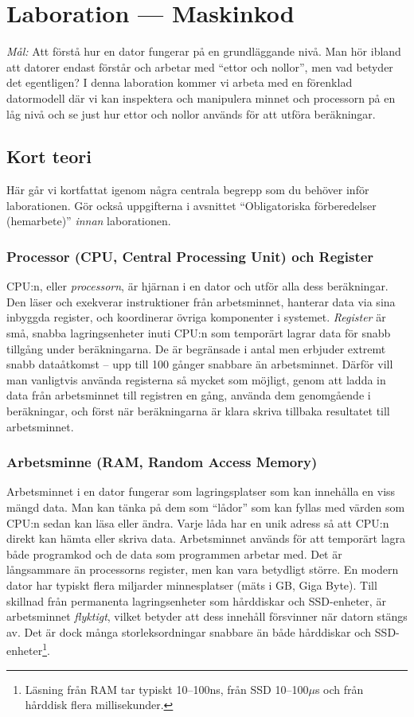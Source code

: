 
\section{Laboration  --- Maskinkod}

\emph{Mål:} Att förstå hur en dator fungerar på en grundläggande nivå. Man hör ibland att datorer endast förstår och arbetar med ``ettor och nollor'', men vad betyder det egentligen? I denna laboration kommer vi arbeta med en förenklad datormodell där vi kan inspektera och manipulera minnet och processorn på en låg nivå och se just hur ettor och nollor används för att utföra beräkningar.

\subsection{Kort teori}
Här går vi kortfattat igenom några centrala begrepp som du behöver inför laborationen. Gör också uppgifterna i avsnittet ``Obligatoriska förberedelser (hemarbete)'' \emph{innan} laborationen.

\subsubsection{Processor (CPU, Central Processing Unit) och Register}
CPU:n, eller \emph{processorn}, är hjärnan i en dator och utför alla dess beräkningar. Den läser och exekverar instruktioner från arbetsminnet, hanterar data via sina inbyggda register, och koordinerar övriga komponenter i systemet. \emph{Register} är små, snabba lagringsenheter inuti CPU:n som temporärt lagrar data för snabb tillgång under beräkningarna. De är begränsade i antal men erbjuder extremt snabb dataåtkomst -- upp till 100 gånger snabbare än arbetsminnet. Därför vill man vanligtvis använda registerna så mycket som möjligt, genom att ladda in data från arbetsminnet till registren en gång, använda dem genomgående i beräkningar, och först när beräkningarna är klara skriva tillbaka resultatet till arbetsminnet.

\subsubsection{Arbetsminne (RAM, Random Access Memory)}
Arbetsminnet i en dator fungerar som lagringsplatser som kan innehålla en viss mängd data. Man kan tänka på dem som ``lådor'' som kan fyllas med värden som CPU:n sedan kan läsa eller ändra. Varje låda har en unik adress så att CPU:n direkt kan hämta eller skriva data.
Arbetsminnet används för att temporärt lagra både programkod och de data som programmen arbetar med.
Det är långsammare än processorns register, men kan vara betydligt större. En modern dator har typiskt flera miljarder minnesplatser (mäts i GB, Giga Byte). 
Till skillnad från permanenta lagringsenheter som hårddiskar och SSD-enheter, är arbetsminnet \emph{flyktigt}, vilket betyder att dess innehåll försvinner när datorn stängs av. Det är dock många storleksordningar snabbare än både hårddiskar och SSD-enheter\footnote{Läsning från RAM tar typiskt 10--100ns, från SSD 10--100$\mu$s och från hårddisk flera millisekunder.}.



